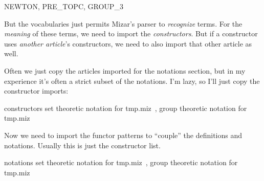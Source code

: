 \nwenddocs{}\endmoddef\nwstartdeflinemarkup{}\nwenddeflinemarkup
NEWTON, PRE_TOPC, GROUP_3

\nwendcode{}\nwdocspar

But the vocabularies just permits Mizar's parser to \emph{recognize}
terms. For the \emph{meaning} of these terms, we need to import the
\emph{constructors}. But if a constructor uses \emph{another article}'s
constructors, we need to also import that other article as well.

Often we just copy the articles imported for the notations section, but
in my experience it's often a strict subset of the notations. I'm lazy,
so I'll just copy the constructor imports:

\nwenddocs{}\endmoddef\nwstartdeflinemarkup{}\nwenddeflinemarkup
constructors \LA{}set theoretic notation for \code{}tmp.miz\edoc{}~{\nwtagstyle{}}\RA{},
  \LA{}group theoretic notation for \code{}tmp.miz\edoc{}~{\nwtagstyle{}}\RA{}

\nwendcode{}\nwdocspar

Now we need to import the functor patterns to ``couple'' the definitions
and notations. Usually this is just the constructor list.

\nwenddocs{}\endmoddef\nwstartdeflinemarkup{}\nwenddeflinemarkup
notations \LA{}set theoretic notation for \code{}tmp.miz\edoc{}~{\nwtagstyle{}}\RA{},
  \LA{}group theoretic notation for \code{}tmp.miz\edoc{}~{\nwtagstyle{}}\RA{}

